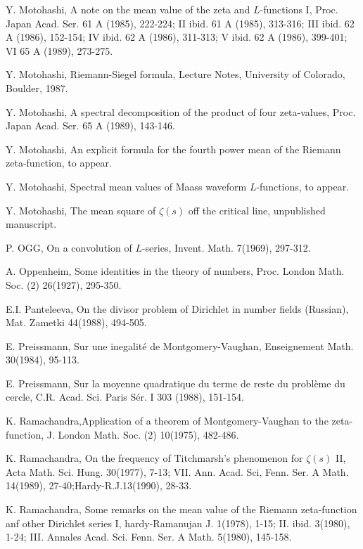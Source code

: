 \begin{thebibliography}{99}
 Y. Motohashi, A note on the mean value of the zeta and $L$-functions I, Proc. Japan Acad. Ser. 61 A (1985), 222-224; II ibid. 61 A (1985), 313-316; III ibid. 62 A (1986), 152-154; IV ibid. 62 A (1986), 311-313; V ibid. 62 A (1986), 399-401; VI 65 A (1989), 273-275.

 Y. Motohashi, Riemann-Siegel formula, Lecture Notes, University of Colorado, Boulder, 1987.

 Y. Motohashi, A spectral decomposition of the product of four zeta-values, Proc. Japan Acad. Ser. 65 A (1989), 143-146.

 Y. Motohashi, An explicit formula for the fourth power mean of the Riemann zeta-function, to appear.

 Y. Motohashi, Spectral mean values of Maass waveform $L$-functions, to appear.

 Y. Motohashi, The mean square of $\zeta(s)$ off the critical line, unpublished manuscript.

 P. OGG, On a convolution of $L$-series, Invent. Math. 7(1969), 297-312.

 A. Oppenheim, Some identities in the theory of numbers, Proc. London Math. Soc. (2) 26(1927), 295-350.

 E.I. Panteleeva, On the divisor problem of Dirichlet in number fields (Russian), Mat. Zametki 44(1988), 494-505.

 E. Preissmann, Sur une inegalit\'e de Montgomery-Vaughan, Enseignement Math. 30(1984), 95-113.

 E. Preissmann, Sur la moyenne quadratique du terme de reste du probl\`eme du cercle, C.R. Acad. Sci. Paris S\'er. I 303 (1988), 151-154.

 K. Ramachandra,\pageoriginale Application of a theorem of Montgomery-Vaughan to the zeta-function, J. London Math. Soc. (2) 10(1975), 482-486.

 K. Ramachandra, On the frequency of Titchmarsh's phenomenon for $\zeta(s)$ II, Acta Math. Sci. Hung. 30(1977), 7-13; VII. Ann. Acad. Sci, Fenn. Ser. A Math. 14(1989), 27-40;Hardy-R.J.13(1990), 28-33.

 K. Ramachandra, Some remarks on the mean value of the Riemann zeta-function anf other Dirichlet series I, hardy-Ramanujan J. 1(1978), 1-15; II. ibid. 3(1980), 1-24; III. Annales Acad. Sci. Fenn. Ser. A Math. 5(1980), 145-158.


\end{thebibliography}
